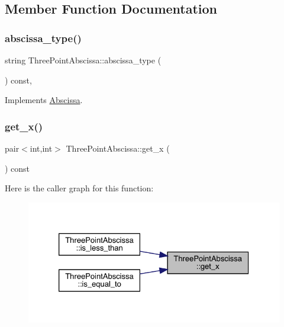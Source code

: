 \subsection{Member Function Documentation}
\mbox{\label{classThreePointAbscissa_a44344558fa4ee658be3344dfc3e69b17}} 
\subsubsection{\texorpdfstring{abscissa\_type()}{abscissa\_type()}}
{\footnotesize\ttfamily string Three\+Point\+Abscissa\+::abscissa\+\_\+type (\begin{DoxyParamCaption}{ }\end{DoxyParamCaption}) const\hspace{0.3cm}{\ttfamily [inline]}, {\ttfamily [virtual]}}



Implements \mbox{\hyperlink{classAbscissa_af57ffcd07eee633bb2313bc7a932f3bb}{Abscissa}}.

\mbox{\label{classThreePointAbscissa_a5e20d950aaa2e9ccf7f4e33ebce296a2}} 
\subsubsection{\texorpdfstring{get\_x()}{get\_x()}}
{\footnotesize\ttfamily pair$<$int,int$>$ Three\+Point\+Abscissa\+::get\+\_\+x (\begin{DoxyParamCaption}{ }\end{DoxyParamCaption}) const\hspace{0.3cm}{\ttfamily [inline]}}

Here is the caller graph for this function\+:
\nopagebreak
\begin{figure}[H]
\begin{center}
\leavevmode
\includegraphics[width=326pt]{df/d59/classThreePointAbscissa_a5e20d950aaa2e9ccf7f4e33ebce296a2_icgraph}
\end{center}
\end{figure}
\mbox{\label{classThreePointAbscissa_a91dd5c897c1b2b1fe271597fdc0d5c3d}} 
